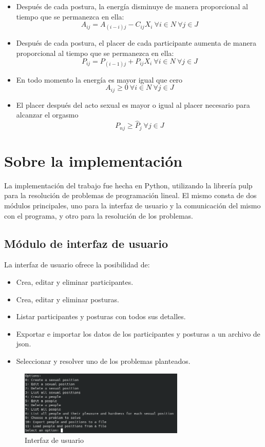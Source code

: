 \documentclass[12pt]{article}
\begin{document}
\begin{itemize}
    \item Después de cada postura, la energía disminuye de manera proporcional al tiempo que se permanezca en ella: $$ A_{ij} = A_{(i-i)j}-C_{ij}X_{i} \ \forall i \in N \ \forall j \in J$$
    \item Después de cada postura, el placer de cada participante aumenta de manera proporcional al tiempo que se permanezca en ella: $$ P_{ij}=P_{(i-1)j}+P_{ij}X_{i} \ \forall i \in N \ \forall j \in J $$
    \item En todo momento la energía es mayor igual que cero $$ A_{ij}\geq 0 \ \forall i \in N \ \forall j \in J  $$
    \item El placer después del acto sexual es mayor o igual al placer necesario para alcanzar el orgasmo $$ P_{nj}\geq \widehat{P}_j \ \forall j \in J $$
\end{itemize}

\section{Sobre la implementación}

La implementación del trabajo fue hecha en Python, utilizando la librería pulp para la resolución de problemas de programación lineal. El mismo consta de dos módulos principales, uno para la interfaz de usuario y la comunicación del mismo con el programa, y otro para la resolución de los problemas.

\subsection{Módulo de interfaz de usuario}

La interfaz de usuario ofrece la posibilidad de:

\begin{itemize}
    \item Crea, editar y eliminar participantes.
    \item Crea, editar y eliminar posturas.
    \item Listar participantes y posturas con todos sus detalles.
    \item Exportar e importar los datos de los participantes y posturas a un archivo de json.
    \item Seleccionar y resolver uno de los problemas planteados.
\end{itemize}


\newpage
\begin{figure}
    \centering
    \includegraphics[width=0.7\textwidth]{images/ui_example.png}
    \caption{Interfaz de usuario}
    \label{fig:interfaz}
\end{figure}
\end{document}
